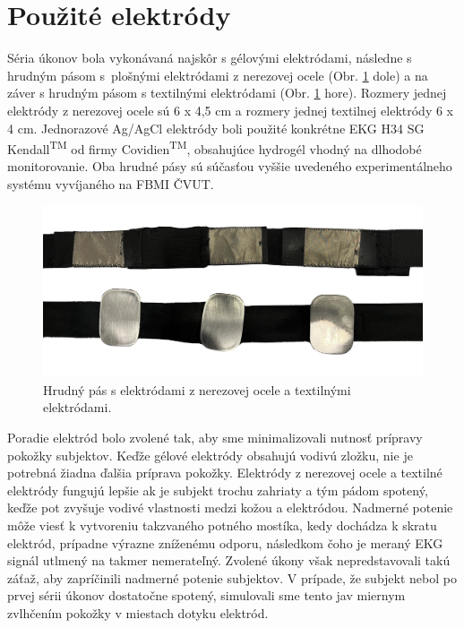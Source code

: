 \section{Použité elektródy}

 Séria úkonov bola vykonávaná najskôr s gélovými elektródami, následne s hrudným pásom s~plošnými elektródami z nerezovej ocele (Obr. \ref{fig:electrodes} dole) a na záver s hrudným pásom s textilnými elektródami (Obr. \ref{fig:electrodes} hore). Rozmery jednej elektródy z nerezovej ocele sú 6 x 4,5 cm a rozmery jednej textilnej elektródy 6 x 4 cm. Jednorazové Ag/AgCl elektródy boli použité konkrétne EKG H34 SG Kendall\textsuperscript{TM} od firmy Covidien\textsuperscript{TM}, obsahujúce hydrogél vhodný na dlhodobé monitorovanie. Oba hrudné pásy sú súčasťou vyššie uvedeného experimentálneho systému vyvíjaného na FBMI ČVUT.

 \begin{figure}[H]
    \centering
    \includegraphics[scale=0.1]{img/electrodes.jpg}
    \caption{Hrudný pás s elektródami z nerezovej ocele a textilnými elektródami.}
    \label{fig:electrodes}
\end{figure}
 
 Poradie elektród bolo zvolené tak, aby sme minimalizovali nutnosť prípravy pokožky subjektov. Keďže gélové elektródy obsahujú vodivú zložku, nie je potrebná žiadna ďalšia príprava pokožky. Elektródy z nerezovej ocele a textilné elektródy fungujú lepšie ak je subjekt trochu zahriaty a tým pádom spotený, keďže pot zvyšuje vodivé vlastnosti medzi kožou a elektródou. Nadmerné potenie môže viesť k vytvoreniu takzvaného potného mostíka, kedy dochádza k skratu elektród, prípadne výrazne zníženému odporu, následkom čoho je meraný EKG signál utlmený na takmer nemerateľný. Zvolené úkony však nepredstavovali takú záťaž, aby zapríčinili nadmerné potenie subjektov. V prípade, že subjekt nebol po prvej sérii úkonov dostatočne spotený, simulovali sme tento jav miernym zvlhčením pokožky v miestach dotyku elektród.

